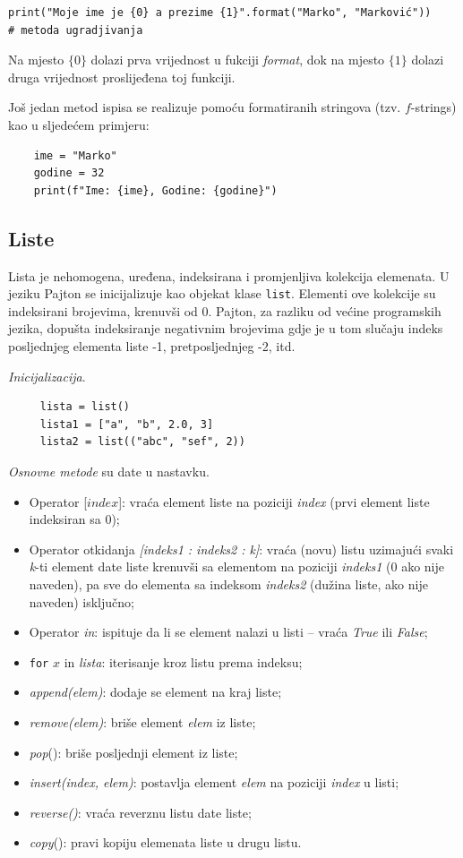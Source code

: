\begin{verbatim}
print("Moje ime je {0} a prezime {1}".format("Marko", "Marković")) 
# metoda ugradjivanja
\end{verbatim}
Na mjesto $\{0\}$ dolazi prva vrijednost u fukciji \textit{format}, dok na mjesto $\{1\}$ dolazi druga  vrijednost proslijeđena toj funkciji.  

Još jedan metod ispisa se realizuje pomoću formatiranih stringova (tzv. $f$-strings) kao u sljedećem primjeru:
\begin{verbatim}
	ime = "Marko"
	godine = 32
	print(f"Ime: {ime}, Godine: {godine}")
\end{verbatim}

\subsection{Liste}
Lista je nehomogena, uređena, indeksirana i promjenljiva kolekcija elemenata. U jeziku Pajton se inicijalizuje kao objekat klase \texttt{list}. Elementi ove kolekcije su indeksirani brojevima, krenuvši od 0. Pajton, za razliku od većine programskih jezika, dopušta indeksiranje negati\-vnim brojevima gdje je u tom slučaju indeks posljednjeg elementa liste -1, pretposljednjeg -2, itd.  

\textit{Inicijalizacija}.

\begin{verbatim}
	 lista = list()
	 lista1 = ["a", "b", 2.0, 3]
	 lista2 = list(("abc", "sef", 2))
\end{verbatim}

\textit{Osnovne metode} su date u nastavku.   

\begin{itemize}
	\item Operator [$index$]: vraća element liste na poziciji \textit{index} (prvi element liste indeksiran sa 0); 
	\item Operator otkidanja \textit{[indeks1 : indeks2 : k]}: vraća (novu) listu uzimajući svaki \textit{k}-ti  element date liste  krenuvši sa elementom na poziciji \textit{indeks1} (0 ako nije naveden),  pa sve do elementa sa indeksom \textit{indeks2} (dužina liste, ako nije naveden) isključno; 
	\item Operator \textit{in}: ispituje da li se element nalazi u listi -- vraća \emph{True} ili \emph{False};
	\item \texttt{for} $x$ in \emph{lista}: iterisanje kroz listu prema indeksu; 
	\item \textit{append(elem)}: dodaje se element na kraj liste;
	\item  \textit{remove(elem)}: briše element \textit{elem} iz liste;
	\item  \textit{pop}(): briše posljednji element iz liste;
	\item  \textit{insert(index, elem)}: postavlja element \textit{elem} na poziciji \textit{index} u listi;
	\item  \textit{reverse()}: vraća reverznu  listu date liste; 
	\item \textit{copy}(): pravi kopiju elemenata liste u drugu listu. 
 \end{itemize}

